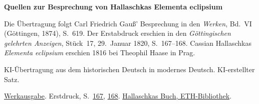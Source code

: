 \clearpage\thispagestyle{empty}
\begin{center}\Large\bfseries Quellen zur Besprechung von Hallaschkas Elementa eclipsium\end{center}

Die Übertragung folgt Carl Friedrich Gauß’ Besprechung in den \emph{Werken}, Bd.~VI (Göttingen, 1874), S.~619. Der Erstabdruck erschien in den \emph{Göttingischen gelehrten Anzeigen}, Stück~17, 29.~Januar 1820, S.~167--168. Cassian Hallaschkas \emph{Elementa eclipsium} erschien 1816 bei Theophil Haase in Prag.

KI-Übertragung aus dem historischen Deutsch in modernes Deutsch. KI-erstellter Satz.

\href{https://gdz.sub.uni-goettingen.de/id/PPN236007467}{Werkausgabe}. Erstdruck, S.~\href{https://images.p.sub.uni-goettingen.de/iiif/image/gdz:PPN319721507_1820:00000161/full/1650,/0/default.jpg}{167}, \href{https://images.p.sub.uni-goettingen.de/iiif/image/gdz:PPN319721507_1820:00000162/full/1650,/0/default.jpg}{168}. \href{https://www.e-rara.ch/zut/content/titleinfo/5216006}{Hallaschkas Buch, ETH-Bibliothek}.

\clearpage
